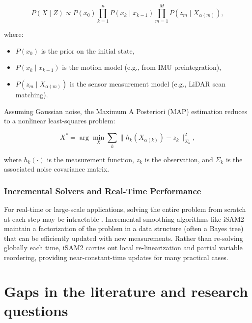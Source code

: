 \begin{equation}
P(X \mid Z) \propto P(x_0) \prod_{k=1}^n P(x_k \mid x_{k-1}) \prod_{m=1}^M P(z_m \mid X_{\alpha(m)}),
\label{eq:fg_bayes}
\end{equation}

where:
\begin{itemize}
    \item $P(x_0)$ is the prior on the initial state,
    \item $P(x_k \mid x_{k-1})$ is the motion model (e.g., from IMU preintegration),
    \item $P(z_m \mid X_{\alpha(m)})$ is the sensor measurement model (e.g., LiDAR scan matching).
\end{itemize}

Assuming Gaussian noise, the Maximum A Posteriori (MAP) estimation reduces to a nonlinear least-squares problem:

\begin{equation}
X^* = \arg\min_X \sum_k \| h_k(X_{\alpha(k)}) - z_k \|_{\Sigma_k}^2,
\label{eq:fg_map}
\end{equation}

where $h_k(\cdot)$ is the measurement function, $z_k$ is the observation, and $\Sigma_k$ is the associated noise covariance matrix.


\subsubsection{Incremental Solvers and Real-Time Performance}
For real-time or large-scale applications, solving the entire problem from scratch at each step may be intractable \cite{thrun2005probabilistic}. Incremental smoothing algorithms like iSAM2 \cite{kaess2012isam2} maintain a factorization of the problem in a data structure (often a Bayes tree) that can be efficiently updated with new measurements. Rather than re-solving globally each time, iSAM2 carries out local re-linearization and partial variable reordering, providing near-constant-time updates for many practical cases.
\section{Gaps in the literature and research questions}





